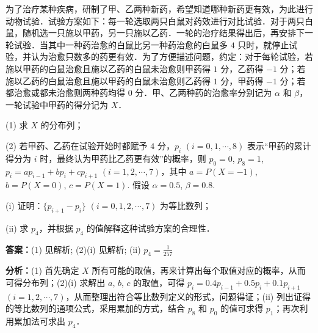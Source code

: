 \begin{question}[points=12]
为了治疗某种疾病，研制了甲、乙两种新药，希望知道哪种新药更有效，为此进行动物试验．试验方案如下：每一轮选取两只白鼠对药效进行对比试验．对于两只白鼠，随机选一只施以甲药，另一只施以乙药．一轮的治疗结果得出后，再安排下一轮试验．当其中一种药治愈的白鼠比另一种药治愈的白鼠多 $4$ 只时，就停止试验，并认为治愈只数多的药更有效．为了方便描述问题，约定：对于每轮试验，若施以甲药的白鼠治愈且施以乙药的白鼠未治愈则甲药得 $1$ 分，乙药得 $-1$ 分；若施以乙药的白鼠治愈且施以甲药的白鼠未治愈则乙药得 $1$ 分，甲药得 $-1$ 分；若都治愈或都未治愈则两种药均得 $0$ 分．甲、乙两种药的治愈率分别记为 $\alpha$ 和 $\beta$，一轮试验中甲药的得分记为 $X$．

(1) 求 $X$ 的分布列；

(2) 若甲药、乙药在试验开始时都赋予 $4$ 分，$p_i$ $(i = 0, 1, \cdots, 8)$ 表示“甲药的累计得分为 $i$ 时，最终认为甲药比乙药更有效”的概率，则 $p_0 = 0$, $p_8 = 1$, $p_i = a p_{i-1} + b p_i + c p_{i+1}$ $(i = 1, 2, \cdots, 7)$，其中 $a = P(X = -1)$, $b = P(X = 0)$, $c = P(X = 1)$. 假设 $\alpha = 0.5$, $\beta = 0.8$.

(i) 证明：$\{p_{i+1} - p_i\}$ $(i = 0, 1, 2, \cdots, 7)$ 为等比数列；

(ii) 求 $p_4$，并根据 $p_4$ 的值解释这种试验方案的合理性．
\begin{solution}
\textbf{答案：}(1) 见解析; (2)(i) 见解析; (ii) $p_4 = \frac{1}{257}$

\textbf{分析：}(1) 首先确定 $X$ 所有可能的取值，再来计算出每个取值对应的概率，从而可得分布列；(2)(i) 求解出 $a$, $b$, $c$ 的取值，可得 $p_i = 0.4p_{i-1} + 0.5p_i + 0.1p_{i+1}$ $(i = 1,2,\cdots,7)$，从而整理出符合等比数列定义的形式，问题得证；(ii) 列出证得的等比数列的通项公式，采用累加的方式，结合 $p_8$ 和 $p_0$ 的值可求得 $p_1$；再次利用累加法可求出 $p_4$．


\end{solution}
\end{question}

